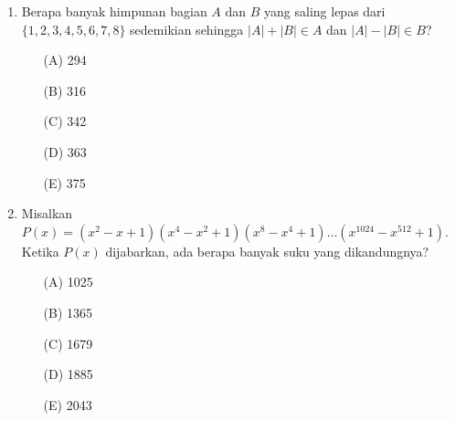 \documentclass[12pt]{scrartcl}
\begin{document}
\begin{enumerate}
    \item Berapa banyak himpunan bagian $A$ dan $B$ yang saling lepas dari $\{1, 2, 3, 4, 5, 6, 7, 8\}$ sedemikian sehingga $|A|+|B|\in A$ dan $|A|-|B|\in B$?
    \begin{itemize}
        \item[(A)] 294
        \item[(B)] 316
        \item[(C)] 342
        \item[(D)] 363
        \item[(E)] 375
    \end{itemize}

    \item Misalkan $P(x)=(x^{2}-x+1)(x^{4}-x^{2}+1)(x^{8}-x^{4}+1)\dots(x^{1024}-x^{512}+1)$. Ketika $P(x)$ dijabarkan, ada berapa banyak suku yang dikandungnya?
    \begin{itemize}
        \item[(A)] 1025
        \item[(B)] 1365
        \item[(C)] 1679
        \item[(D)] 1885
        \item[(E)] 2043
    \end{itemize}
\end{enumerate}
\end{document}
